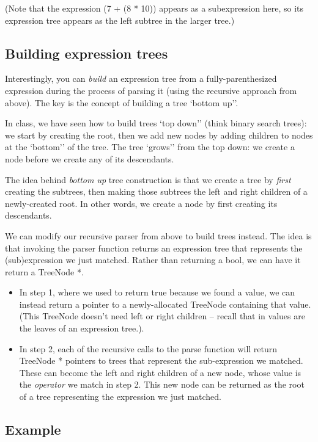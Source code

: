 \documentclass{article}
\begin{document}
(Note that the expression (7 + (8 * 10)) appears as a subexpression here, so its expression tree appears as the left subtree in the larger tree.)

\subsection{Building expression trees}

Interestingly, you can {\em build} an expression tree from a fully-parenthesized expression during the process of parsing it (using the recursive approach from above). The key is the concept of building a tree `bottom up''.


In class, we have seen how to build trees `top down'' (think binary search trees): we start by creating the root, then we add new nodes by adding children to nodes at the `bottom'' of the tree. The tree `grows'' from the top down: we create a node before we create any of its descendants.


The idea behind {\em bottom up} tree construction is that we create a tree by {\em first} creating the subtrees, then making those subtrees the left and right children of a newly-created root. In other words, we create a node by first creating its descendants.


We can modify our recursive parser from above to build trees instead. The idea is that invoking the parser function returns an expression tree that represents the (sub)expression we just matched. Rather than returning a \textsf{bool}, we can have it return a \textsf{TreeNode *}.

\begin{itemize}
\item    In step 1, where we used to return \textsf{true} because we found a value, we can instead return a pointer to a newly-allocated \textsf{TreeNode} containing that value. (This \textsf{TreeNode} doesn't need left or right children -- recall that in values are the leaves of an expression tree.).
\item    In step 2, each of the recursive calls to the parse function will return \textsf{TreeNode *} pointers to trees that represent the sub-expression we matched. These can become the left and right children of a new node, whose value is the {\em operator} we match in step 2. This new node can be returned as the root of a tree representing the expression we just matched.
\end{itemize}

\subsection{Example}
\end{document}
